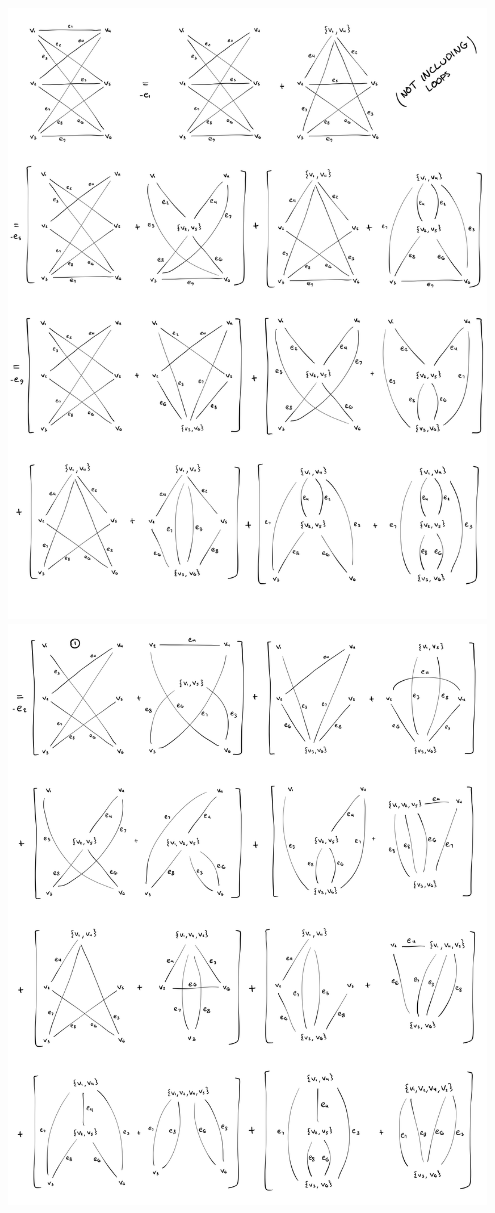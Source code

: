 \documentclass[11pt]{article}
\begin{document}
\begin{itemize}
  \includegraphics[width=0.95\textwidth]{1.jpeg} \\
  \includegraphics[width=0.95\textwidth]{2.jpeg} \\

\end{itemize}
\end{document}
